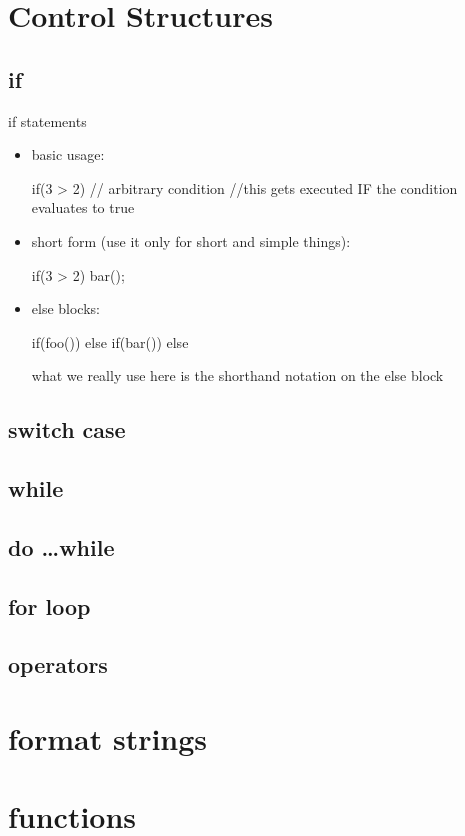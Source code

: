 \documentclass[10pt,graphics,aspectratio=169,table]{beamer}
\begin{document}
\section{Control Structures}

\subsection{if}
\begin{frame}[fragile]{if statements}
    \begin{itemize}
    \item basic usage:
        \begin{codeblock} 
if(3 > 2){  // arbitrary condition
    //this gets executed IF the condition evaluates to true
}
        \end{codeblock}
    \item short form (use it only for short and simple things):
        \begin{codeblock} 
if(3 > 2) bar();
        \end{codeblock}

    \item else blocks:
\begin{codeblock} 
if(foo()){ 
}
else if(bar()){ 
}
else{ 
}
\end{codeblock}

what we really use here is the shorthand notation on the else block

\end{itemize}
\end{frame}

\subsection{switch case}

\subsection{while}

\subsection{do \ldots while}

\subsection{for loop}

\subsection{operators}

\section{format strings}

\section{functions}
\end{document}
